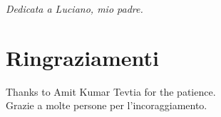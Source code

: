 \documentclass[a4paper, italian, oneside
, 12pt
]{book}
\begin{document}
\newpage \vspace*{8cm}
\begin{center}
\large {\it Dedicata a Luciano, mio padre.}
\end{center} 

\chapter*{Ringraziamenti}
Thanks to Amit Kumar Tevtia for the patience.
\\
Grazie a molte persone per l'incoraggiamento.


\pagestyle{empty}
\cleardoublepage

\pagestyle{fancy}
\addtolength{\headwidth}{0.7cm}

\renewcommand{\chaptermark}[1]{\markboth{\thechapter.\ #1}{}}
\renewcommand{\sectionmark}[1]{\markright{#1\ \thesection}}
\lhead[\fancyplain{}{\textbf{\footnotesize{\leftmark}}}]{}
\chead{}
\rhead[]{\fancyplain{}{\textbf{\footnotesize{\rightmark}}}}


\tableofcontents
\mainmatter








\end{document}
